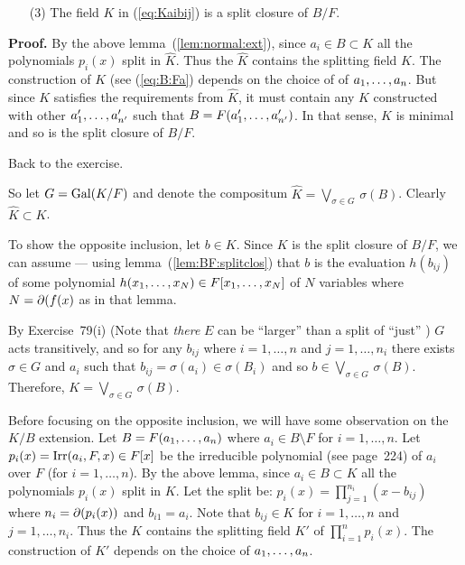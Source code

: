\begin{myenumerate}
\begin{itemize}
\begin{llem}
\begin{itemize}
    \item[(3)]
      The field $K$ in (\ref{eq:Kaibij}) is a
      split closure of \(B/F\).
   \end{itemize}
   \end{llem}
   \textbf{Proof.}
   By the above lemma~(\ref{lem:normal:ext}), since \(a_i\in B\subset K\)
   all the polynomials \(p_i(x)\) split in \(\hat{K}\).
   Thus the \(\hat{K}\) contains the splitting field $K$.
   The construction of $K$ (see (\ref{eq:B:Fa}) depends on the choice of
   of \(a_1,\ldots,a_{n}\).
   But since $K$ satisfies the requirements from \(\hat{K}\),
   it must contain any $K$ constructed with other
   \(a'_1,\ldots,a'_{n'}\) such that \(B=F(a'_1,\ldots,a'_{n'})\).
   In that sense, $K$ is minimal and so is the split closure of \(B/F\).
   \proofend

   Back to the exercise.

   So let \(G=\mathop{\rm Gal}\nolimits(K/F)\) and denote the compositum
   \(\hat{K} = \bigvee_{\sigma\in G} \,\sigma(B)\).
   Clearly \(\hat{K}\subset K\).

   To show the opposite inclusion, let \(b\in K\).
   Since $K$ is the split closure of \(B/F\),
   we can assume --- using lemma~(\ref{lem:BF:splitclos}) %
   that $b$ is the evaluation \(h(b_{ij})\)
   of some polynomial \(h(x_1,\ldots,x_{N})\in F[x_1,\ldots,x_{N}]\)
   of $N$ variables
   where \(N=\partial(f(x)\) as in that lemma.

   By Exercise~79(i) (Note that \emph{there} $E$ can be ``larger'' than
   a split of ``just'' \fx)
   $G$ acts transitively,
   and so for any \(b_{ij}\) where
   \(i=1,\ldots,n\) and \(j=1,\ldots,n_i\)
   there exists \(\sigma\in G\) and \(a_i\) such that
   \(b_{ij} = \sigma(a_i) \in \sigma(B_i)\) and so
   \(b \in \bigvee_{\sigma\in G} \,\sigma(B)\).
   Therefore, \(K = \bigvee_{\sigma\in G} \,\sigma(B)\).


 \iffalse
   Before focusing on the opposite inclusion, we
   will have some observation on the \(K/B\) extension.
   Let \(B=F(a_1,\ldots,a_{n})\) where \(a_i\in B\setminus F\) for \(i=1,\ldots,n\).
   Let \(p_i(x)=\mathop{\rm Irr}\nolimits(a_i,F,x)\in F[x]\) be the irreducible
   polynomial (see \cite{Lang94} page~224) of \(a_i\) over $F$
   (for \(i=1,\ldots,n\)).
   By the above lemma, since \(a_i\in B\subset K\)
   all the polynomials \(p_i(x)\) split in $K$.
   Let the split be: \(p_i(x) = \prod_{j=1}^{n_i} (x - b_{ij})\) where
   \(n_i = \partial(p_i(x))\) and  \(b_{i1}=a_i\).
   Note that \(b_{ij}\in K\) for \(i=1,\ldots,n\) and \(j=1,\ldots,n_i\).
   Thus the $K$ contains the splitting field \(K'\) of \(\prod_{i=1}^n p_i(x)\).
   The construction of \(K'\) depends on the choice
   of \(a_1,\ldots,a_{n}\).


\end{itemize}
\end{myenumerate}
